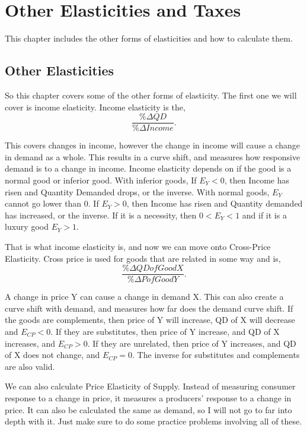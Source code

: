 \newpage
\chapter{\normalfont Other Elasticities and Taxes}
This chapter includes the other forms of elasticities and how to calculate them.
\section{Other Elasticities}
So this chapter covers some of the other forms of elasticity. The first one we will cover is income elasticity. Income elasticity is the, 
\[
    \frac{\%\Delta QD}{\%\Delta Income}
.\] 

This covers changes in income, however the change in income will cause a change in demand as a whole. This results in a curve shift, and measures how responsive demand is to a change in income. Income elasticity depends on if the good is a normal good or inferior good. With inferior goods, If $E_Y < 0$, then Income has risen and Quantity Demanded drops, or the inverse. With normal goods, $E_Y$ cannot go lower than 0. If $E_Y > 0$, then Income has risen and Quantity demanded has increased, or the inverse. If it is a necessity, then $0 < E_Y < 1$ and if it is a luxury good $E_Y > 1$.

That is what income elasticity is, and now we can move onto Cross-Price Elasticity. Cross price is used for goods that are related in some way and is, 
\[
    \frac{\%\Delta QD of Good X}{\%\Delta P of Good Y}
.\] 

A change in price Y can cause a change in demand X. This can also create a curve shift with demand, and measures how far does the demand curve shift. If the goods are complements, then price of Y will increase, QD of X will decrease and $E_{CP} < 0$. If they are substitutes, then price of Y increase, and QD of X increases, and  $E_{CP} > 0$. If they are unrelated, then price of Y increases, and QD of X does not change, and $E_{CP} = 0$. The inverse for substitutes and complements are also valid.

We can also calculate Price Elasticity of Supply. Instead of measuring consumer response to a change in price, it measures a producers' response to a change in price. It can also be calculated the same as demand, so I will not go to far into depth with it. Just make sure to do some practice problems involving all of these. 
